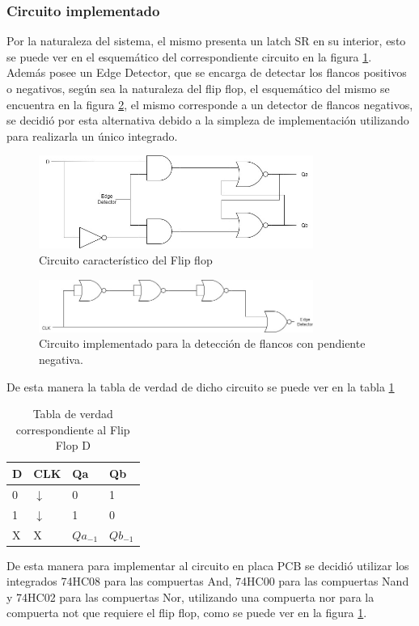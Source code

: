 \subsubsection{Circuito implementado}
\noindent
Por la naturaleza del sistema, el mismo presenta un latch SR en su interior, esto se puede ver en el esquemático del correspondiente circuito en la figura \ref{ej6_flip_flop_D}. Además posee un Edge Detector, que se encarga de detectar los flancos positivos o negativos, según sea la naturaleza del flip flop, el esquemático del mismo se encuentra en la figura \ref{ej6_flip_flop_D_edge}, el mismo corresponde a un detector de flancos negativos, se decidió por esta alternativa debido a la simpleza de implementación utilizando para realizarla un único integrado.
%
%
\begin{figure}[H]
    \centering
        \centering
        \includegraphics[width=0.8\textwidth]{figs/Ej6/flipflop.jpg} %
         \caption{Circuito característico del Flip flop}
         \label{ej6_flip_flop_D}
\end{figure}
%
\begin{figure}[H]
    \centering
        \centering
        \includegraphics[width=0.8\textwidth]{figs/Ej6/Edgedetetor.jpg} %
         \caption{Circuito implementado para la detección de flancos con pendiente negativa.}
         \label{ej6_flip_flop_D_edge}
\end{figure}
%
\noindent
De esta manera la tabla de verdad de dicho circuito se puede ver en la tabla \ref{ej6_tabla_flip_flop_D}
%
%
\begin{table}[H]
\caption{Tabla de verdad correspondiente al Flip Flop D}
\label{ej6_tabla_flip_flop_D}
\centering
\begin{tabular}{|l|l||l|l|}
\hline
D & CLK                     & Qa         & Qb         \\ \hline
0 & $\downarrow$ & 0          & 1          \\ \hline
1 & $\downarrow$ & 1          & 0          \\ \hline
X & X                       & $Qa_{-1}$ & $Qb_{-1}$ \\ \hline
\end{tabular}
\end{table}
%
\noindent
De esta manera para implementar al circuito en placa PCB se decidió utilizar los integrados 74HC08 para las compuertas And, 74HC00 para las compuertas Nand y 74HC02 para las compuertas Nor, utilizando una compuerta nor para la compuerta not que requiere el flip flop, como se puede ver en la figura \ref{ej6_flip_flop_D}.
%
